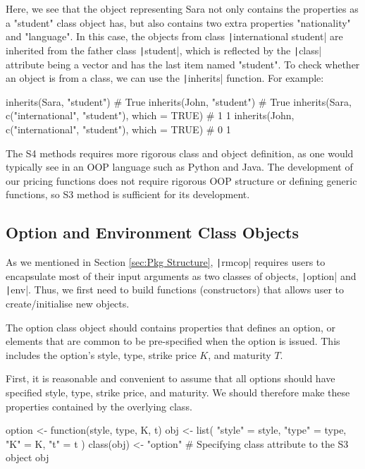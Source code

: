 Here, we see that the object representing Sara not only contains the properties as a "student" class object has, but also contains two extra properties "nationality" and "language". In this case, the objects from class \texttt|international student| are inherited from the father class \texttt|student|, which is reflected by the \texttt|class| attribute being a vector and has the last item named "student". To check whether an object is from a class, we can use the \texttt|inherits| function. For example:

\begin{Rminted}
inherits(Sara, "student") # True
inherits(John, "student") # True
inherits(Sara, c("international", "student"), which = TRUE) # 1 1
inherits(John, c("international", "student"), which = TRUE) # 0 1
\end{Rminted}

The S4 methods requires more rigorous class and object definition, as one would typically see in an OOP language such as Python and Java. The development of our pricing functions does not require rigorous OOP structure or defining generic functions, so S3 method is sufficient for its development.

\subsection{Option and Environment Class Objects}

As we mentioned in Section \ref{sec:Pkg Structure}, \texttt|rmcop| requires users to encapsulate most of their input arguments as two classes of objects, \texttt|option| and \texttt|env|. Thus, we first need to build functions (constructors) that allows user to create/initialise new objects.

The option class object should contains properties that defines an option, or elements that are common to be pre-specified when the option is issued. This includes the option's style, type, strike price $K$, and maturity $T$.

First, it is reasonable and convenient to assume that all options should have specified style, type, strike price, and maturity. We should therefore make these properties contained by the overlying class.

\begin{Rminted}
option <- function(style, type, K, t) {
    obj <- list(
        "style" = style,
        "type" = type,
        "K" = K,
        "t" = t
    )
    class(obj) <- "option" # Specifying class attribute to the S3 object
    obj
}
\end{Rminted}

